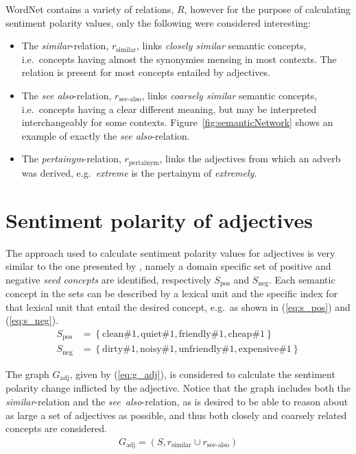 WordNet contains a variety of relations, $R$, however for the purpose of calculating sentiment polarity values, only the following were considered interesting:
\begin{itemize}
	\item The \emph{similar}-relation, $r_\mathrm{similar}$, links \emph{closely similar} semantic concepts, i.e.\ concepts having almost the synonymies mensing in most contexts. The relation is present for most concepts entailed by adjectives.
	\item The \emph{see also}-relation, $r_\mathrm{see\text{-}also}$, links \emph{coarsely similar} semantic concepts, i.e.\ concepts having a clear different meaning, but may be interpreted interchangeably for some contexts. Figure~\vref{fig:semanticNetwork} shows an example of exactly the \emph{see also}-relation.
	\item The \emph{pertainym}-relation, $r_\mathrm{pertainym}$, links the adjectives from which an adverb was derived, e.g.\ \emph{extreme} is the pertainym of \emph{extremely}.
\end{itemize}
\vspace{1em}

\section{Sentiment polarity of adjectives}
\label{sec:sentimentAdj}
The approach used to calculate sentiment polarity values for adjectives is very similar to the one presented by \citeauthor{valenceShifting} , namely a domain specific set of positive and negative \emph{seed concepts} are identified, respectively $S_\mathrm{pos}$ and $S_\mathrm{neg}$. Each semantic concept in the sets can be described by a lexical unit and the specific index for that lexical unit that entail the desired concept, e.g.\ as shown in (\ref{eq:s_pos}) and (\ref{eq:s_neg}).
\begin{align}
	S_\mathrm{pos} &= \left\{ \text{clean}\#1, \text{quiet}\#1, \text{friendly}\#1, \text{cheap}\#1 \right\} \label{eq:s_pos}\\
	S_\mathrm{neg} &= \left\{ \text{dirty}\#1, \text{noisy}\#1, \text{unfriendly}\#1, \text{expensive}\#1 \right\} \label{eq:s_neg}
\end{align}

The graph $G_\mathrm{adj}$, given by (\ref{eq:g_adj}), is considered to calculate the sentiment polarity change inflicted by the adjective. Notice that the graph includes both the \emph{similar}-relation and the \emph{see\ also}-relation, as is desired to be able to reason about as large a set of adjectives as possible, and thus both closely and coarsely related concepts are considered.
\begin{align}
	G_\mathrm{adj} = (S, r_\mathrm{similar} \cup r_\mathrm{see\text{-}also})
	\label{eq:g_adj}
\end{align}
 
